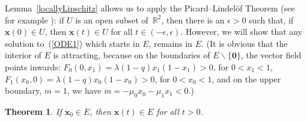 \documentclass[12pt]{article}
\newtheorem{theorem}{Theorem}
\newcommand\R{\ensuremath{\mathbb{R}}}
\newcommand{\bzero}{\boldsymbol{0}}
\newcommand{\bx}{\boldsymbol{x}}
\begin{document}
Lemma~\ref{locallyLipschitz} allows us to apply the 
Picard–Lindel{\"o}f Theorem (see for example \cite{VE21}): 
if $U$ is an open subset of~$\R^2$, then
there is an $\epsilon>0$ such that, if $\bx(0)\in U$, then $\bx(t)\in U$ 
for all $t\in (-\epsilon,\epsilon)$.
However, we will show that any solution to~(\ref{ODE1}) 
which starts in $E$, remains in $E$.
(It is obvious that the interior of $E$ is attracting, because
on the boundaries of $E\backslash \{\bzero\}$, 
the vector field points inwards: 
$F_0(0,x_1)=\lambda(1-q)x_1(1-x_1)>0$, for $0<x_1<1$,
$F_1(x_0,0)=\lambda(1-q)x_0(1-x_0)>0$, for $0<x_0<1$,
and on the upper boundary, $m=1$, we have 
$\dot{m}=-\mu_0 x_0 -\mu_1 x_1 <0$.)

\begin{theorem}
If $\bx_0\in E$, then $\bx(t)\in E$ for all $t>0$.
\end{theorem}
\end{document}
